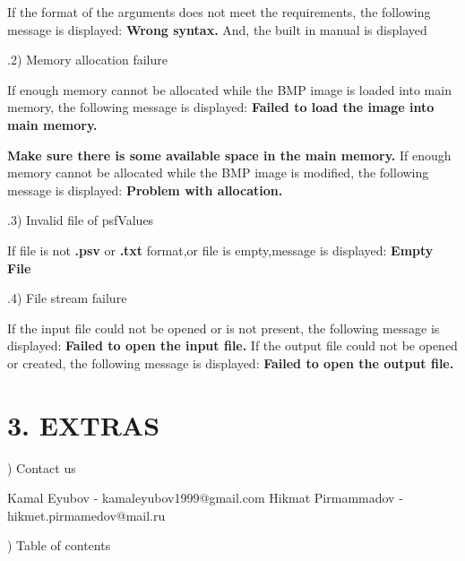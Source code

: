 \documentclass{article}
\begin{document}
If the format of the arguments does not meet the requirements, the following message is displayed:\newline
\indent\textbf{Wrong syntax.}\newline
And, the built in manual is displayed

.2) Memory allocation failure

If enough memory cannot be allocated while the BMP image is loaded into main memory, the following message is displayed:\newline
\indent\textbf{Failed to load the image into main memory.}\newline 

\indent\textbf{Make sure there is some available space in the main memory.}\newline
If enough memory cannot be allocated while the BMP image is modified, the following message is displayed:\newline
\indent\textbf{Problem with allocation.}\newline


.3) Invalid file of psfValues

If file is not \textbf{.psv} or \textbf{.txt} format,or file is empty,message is displayed:\newline
\indent\textbf{ Empty File }\newline


.4) File stream failure

If the input file could not be opened or is not present, the following message is displayed:\newline
\indent\textbf{Failed to open the input file.}\newline
If the output file could not be opened or created, the following message is displayed:\newline
\indent\textbf{Failed to open the output file.}\newline


\section*{3. EXTRAS}


) Contact us

Kamal Eyubov - kamaleyubov1999@gmail.com\newline
\indent Hikmat Pirmammadov - hikmet.pirmamedov@mail.ru

) Table of contents
\end{document}
